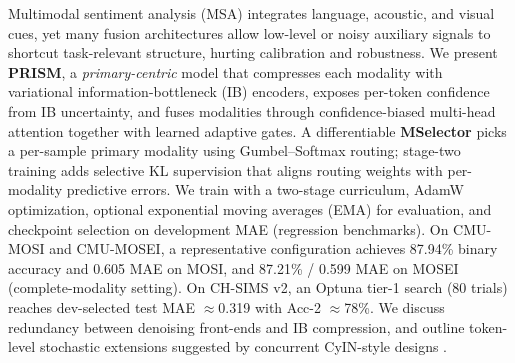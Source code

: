 Multimodal sentiment analysis (MSA) integrates language, acoustic, and visual cues,
yet many fusion architectures allow low-level or noisy auxiliary signals to
shortcut task-relevant structure, hurting calibration and robustness.
We present \textbf{PRISM}, a \emph{primary-centric} model that compresses each
modality with variational information-bottleneck (IB) encoders, exposes per-token
confidence from IB uncertainty, and fuses modalities through confidence-biased
multi-head attention together with learned adaptive gates.
A differentiable \textbf{MSelector} picks a per-sample primary modality using
Gumbel--Softmax routing; stage-two training adds selective KL supervision that
aligns routing weights with per-modality predictive errors.
We train with a two-stage curriculum, AdamW optimization, optional exponential
moving averages (EMA) for evaluation, and checkpoint selection on development
MAE (regression benchmarks).
On CMU-MOSI and CMU-MOSEI, a representative configuration achieves
87.94\% binary accuracy and 0.605 MAE on MOSI, and 87.21\% / 0.599 MAE on MOSEI
(complete-modality setting).
On CH-SIMS v2, an Optuna tier-1 search (80 trials) reaches dev-selected test
MAE $\approx$0.319 with Acc-2 $\approx$78\%.
We discuss redundancy between denoising front-ends and IB compression, and
outline token-level stochastic extensions suggested by concurrent CyIN-style
designs \citep{cyin2025align}.
